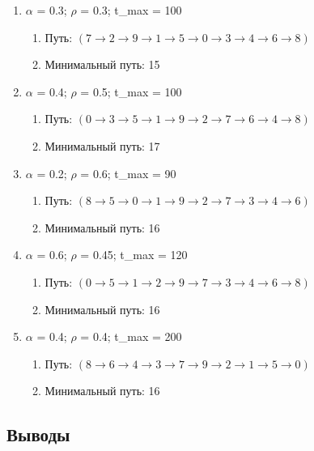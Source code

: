 \documentclass[a4paper,12pt]{article}
\begin{document}
\begin{enumerate}
	\item $\alpha$ = 0.3; $\rho$ = 0.3; t\_max = 100
	\begin{enumerate}
		\item Путь: $( 7 \rightarrow 2 \rightarrow 9 \rightarrow 1 \rightarrow 5 \rightarrow 0 \rightarrow 3 \rightarrow 4 \rightarrow 6 \rightarrow 8 )$
		\item Минимальный путь: 15
	\end{enumerate}
	\item $\alpha$ = 0.4; $\rho$ = 0.5; t\_max = 100
	\begin{enumerate}
		\item Путь: $( 0 \rightarrow 3 \rightarrow 5 \rightarrow 1 \rightarrow 9 \rightarrow 2 \rightarrow 7 \rightarrow 6 \rightarrow 4 \rightarrow 8 )$
		\item Минимальный путь: 17
	\end{enumerate}
	\item $\alpha$ = 0.2; $\rho$ = 0.6; t\_max = 90
	\begin{enumerate}
		\item Путь: $( 8 \rightarrow 5 \rightarrow 0 \rightarrow 1 \rightarrow 9 \rightarrow 2 \rightarrow 7 \rightarrow 3 \rightarrow 4 \rightarrow 6 )$
		\item Минимальный путь: 16
	\end{enumerate}
	\item $\alpha$ = 0.6; $\rho$ = 0.45; t\_max = 120
	\begin{enumerate}
		\item Путь: $( 0 \rightarrow 5 \rightarrow 1 \rightarrow 2 \rightarrow 9 \rightarrow 7 \rightarrow 3 \rightarrow 4 \rightarrow 6 \rightarrow 8 )$
		\item Минимальный путь: 16
	\end{enumerate}
	\item $\alpha$ = 0.4; $\rho$ = 0.4; t\_max = 200
	\begin{enumerate}
		\item Путь: $( 8 \rightarrow 6 \rightarrow 4 \rightarrow 3 \rightarrow 7 \rightarrow 9 \rightarrow 2 \rightarrow 1 \rightarrow 5 \rightarrow 0 )$
		\item Минимальный путь: 16
	\end{enumerate}
\end{enumerate}



\subsection*{Выводы}
\end{document}
